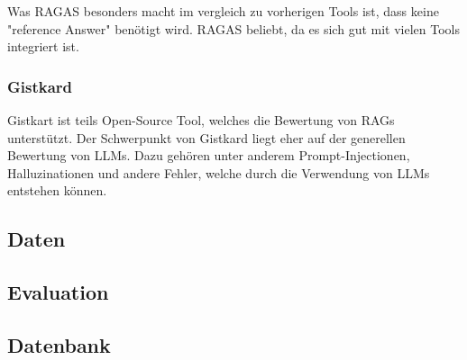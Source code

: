 Was RAGAS besonders macht im vergleich zu vorherigen Tools ist, dass keine "reference Answer" benötigt wird.
RAGAS beliebt, da es sich gut mit vielen Tools integriert ist.

\subsubsection{Gistkard}
Gistkart ist teils Open-Source Tool, welches die Bewertung von RAGs unterstützt.
Der Schwerpunkt von Gistkard liegt eher auf der generellen Bewertung von LLMs.
Dazu gehören unter anderem Prompt-Injectionen, Halluzinationen und andere Fehler, welche durch die Verwendung von LLMs entstehen können.



\subsection{Daten}

\subsection{Evaluation}

\subsection{Datenbank}